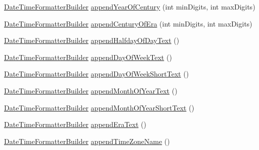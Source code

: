 \begin{DoxyCompactItemize}
\hyperlink{classorg_1_1joda_1_1time_1_1format_1_1_date_time_formatter_builder}{Date\-Time\-Formatter\-Builder} \hyperlink{classorg_1_1joda_1_1time_1_1format_1_1_date_time_formatter_builder_a82869add9045df3bcd561c9548da306d}{append\-Year\-Of\-Century} (int min\-Digits, int max\-Digits)
\item 
\hyperlink{classorg_1_1joda_1_1time_1_1format_1_1_date_time_formatter_builder}{Date\-Time\-Formatter\-Builder} \hyperlink{classorg_1_1joda_1_1time_1_1format_1_1_date_time_formatter_builder_ab4dbe5f94a0586980f88c9138324c170}{append\-Century\-Of\-Era} (int min\-Digits, int max\-Digits)
\item 
\hyperlink{classorg_1_1joda_1_1time_1_1format_1_1_date_time_formatter_builder}{Date\-Time\-Formatter\-Builder} \hyperlink{classorg_1_1joda_1_1time_1_1format_1_1_date_time_formatter_builder_ab5fafa15b8e91f61f9d4fd2b51bf72c4}{append\-Halfday\-Of\-Day\-Text} ()
\item 
\hyperlink{classorg_1_1joda_1_1time_1_1format_1_1_date_time_formatter_builder}{Date\-Time\-Formatter\-Builder} \hyperlink{classorg_1_1joda_1_1time_1_1format_1_1_date_time_formatter_builder_a82b6f83c9130620d83fd3623c691660b}{append\-Day\-Of\-Week\-Text} ()
\item 
\hyperlink{classorg_1_1joda_1_1time_1_1format_1_1_date_time_formatter_builder}{Date\-Time\-Formatter\-Builder} \hyperlink{classorg_1_1joda_1_1time_1_1format_1_1_date_time_formatter_builder_afabdd1a4f519b644c18cdb085e89b029}{append\-Day\-Of\-Week\-Short\-Text} ()
\item 
\hyperlink{classorg_1_1joda_1_1time_1_1format_1_1_date_time_formatter_builder}{Date\-Time\-Formatter\-Builder} \hyperlink{classorg_1_1joda_1_1time_1_1format_1_1_date_time_formatter_builder_adcb621002498d0aa796a008caee803d8}{append\-Month\-Of\-Year\-Text} ()
\item 
\hyperlink{classorg_1_1joda_1_1time_1_1format_1_1_date_time_formatter_builder}{Date\-Time\-Formatter\-Builder} \hyperlink{classorg_1_1joda_1_1time_1_1format_1_1_date_time_formatter_builder_ad3bc80723647f3d7b568177d576620f7}{append\-Month\-Of\-Year\-Short\-Text} ()
\item 
\hyperlink{classorg_1_1joda_1_1time_1_1format_1_1_date_time_formatter_builder}{Date\-Time\-Formatter\-Builder} \hyperlink{classorg_1_1joda_1_1time_1_1format_1_1_date_time_formatter_builder_a155a6b15b62fe0144a6517d61ef0b383}{append\-Era\-Text} ()
\item 
\hyperlink{classorg_1_1joda_1_1time_1_1format_1_1_date_time_formatter_builder}{Date\-Time\-Formatter\-Builder} \hyperlink{classorg_1_1joda_1_1time_1_1format_1_1_date_time_formatter_builder_a5294bafc75eb88f4abf1badc545ac3eb}{append\-Time\-Zone\-Name} ()

\end{DoxyCompactItemize}
